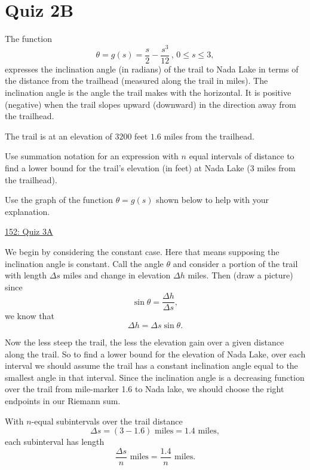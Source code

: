 \documentclass{ximera}
\begin{document}
\section{Quiz 2B}
\begin{question} \label{QldfFDLRE}
The function
\[
      \theta = g(s) = \frac{s}{2} - \frac{s^3}{12} \, , \, 0\leq s \leq 3 , 
\]
expresses the inclination angle (in radians) of the trail to Nada Lake in terms of the distance from the trailhead (measured along the trail in miles). The inclination angle is the angle the trail makes with the horizontal. It is positive (negative) when the trail slopes upward (downward) in the direction away from the trailhead.

The trail is at an elevation of $3200$ feet $1.6$ miles from the trailhead.

Use summation notation for an expression with $n$ equal intervals of distance to find a lower bound for the trail's elevation (in feet) at Nada Lake (3 miles from the trailhead).

Use the graph of the function $\theta=g(s)$ shown below to help with your explanation.

\begin{onlineOnly}
    \begin{center}
\end{center}
\end{onlineOnly}

\href{https://www.desmos.com/calculator/nzhemrajow}{152: Quiz 3A}

\begin{explanation}
We begin by considering the constant case. Here that means supposing the inclination angle is constant. Call the angle $\theta$ and consider a portion of the trail with length $\Delta s$ miles and change in elevation $\Delta h$ miles. Then (draw a picture) since
\[
   \sin \theta = \frac{\Delta h}{\Delta s} ,
\]
we know that
\[
  \Delta h = \Delta s \sin\theta.
\]

Now the less steep the trail, the less the elevation gain over a given distance along the trail. So to find a lower bound for the elevation of Nada Lake, over each interval we should assume the trail has a constant inclination angle equal to the smallest angle in that interval. Since the inclination angle is a decreasing function over the trail from mile-marker 1.6 to Nada lake, we should choose the right endpoints in our Riemann sum.

With $n$-equal subintervals over the trail distance
\[
 \Delta s = (3 - 1.6) \text{ miles} = 1.4 \text{ miles},
\]
each subinterval has length
\[
 \frac{\Delta s}{n} \text{ miles} = \frac{1.4}{n} \text{ miles} .
\]


\end{explanation}
\end{question}
\end{document}
